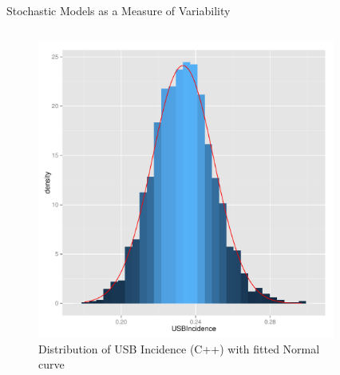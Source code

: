 \documentclass[final]{beamer}
\begin{document}
\begin{frame}
\begin{columns}
\begin{column}{.3\textwidth}
      \begin{block}{Stochastic Models as a Measure of Variability}
        \begin{columns}
          \vspace{-2em}
          \begin{column}{.45\textwidth}
            \begin{figure}[h]
              \begin{center}
                \includegraphics[width=\textwidth]{IN0dist}
              \end{center}
              \caption{Distribution of USB Incidence (C++) with fitted Normal curve}
              \label{fig:IN0dist}
            \end{figure}
          \end{column}
          \begin{column}{.45\textwidth}
            \begin{figure}[h]
              \begin{center}

\end{center}
\end{figure}
\end{column}
\end{columns}
\end{block}
\end{column}
\end{columns}
\end{frame}
\end{document}
